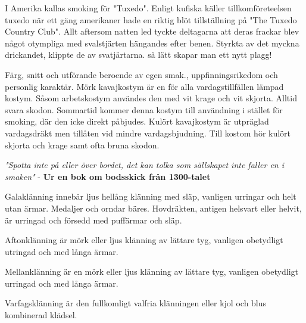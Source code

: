     I Amerika kallas smoking för "Tuxedo". Enligt kufiska käller tillkomföreteelsen tuxedo när ett gäng amerikaner hade en riktig blöt tillställning på "The Tuxedo Country Club". Allt aftersom natten led tyckte deltagarna att deras frackar blev något otympliga med svalstjärten hängandes efter benen. Styrkta av det myckna drickandet, klippte de av svatjärtarna. så lätt skapar man ett nytt plagg!


    Färg, snitt och utförande beroende av egen smak., uppfinningsrikedom och personlig karaktär. Mörk kavajkostym är en för alla vardagstillfällen lämpad kostym. Såsom arbetskostym användes den med vit krage och vit skjorta. Alltid svara skodon. Sommartid kommer denna kostym till användning i stället för smoking, där den icke direkt påbjudes. Kulört kavajkostym är utpräglad vardagsdräkt men tillåten vid mindre vardagsbjudning. Till kostom hör kulört skjorta och krage samt ofta bruna skodon.

    \textit{"Spotta inte på eller över bordet, det kan tolka som sällskapet inte faller en i smaken"} - \textbf{Ur en bok om bodsskick från 1300-talet}

    Galaklänning innebär ljus hellång klänning med släp, vanligen urringar och helt utan ärmar. Medaljer och orndar bäres. Hovdräkten, antigen helsvart eller helvit, är urringad och försedd med puffärmar och släp.

    Aftonklänning är mörk eller ljus klänning av lättare tyg, vanligen obetydligt utringad och med långa ärmar.

    Mellanklänning är en mörk eller ljus klänning av lättare tyg, vanligen obetydligt urringad och med långa ärmar.

    Varfagsklänning är den fullkomligt valfria klänningen eller kjol och blus kombinerad klädsel.
    

    
    

    \newpage